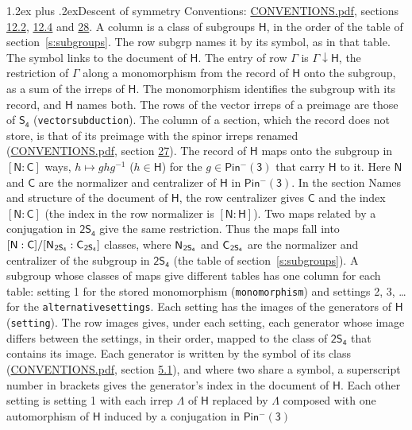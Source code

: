 \documentclass[10pt,a4paper]{article}
\makeatletter
\renewcommand\section{\@startsection{section}{1}{\z@}{-3ex plus -1ex minus -.2ex}%
  {1.2ex plus .2ex}{\normalfont\large\sffamily\bfseries\color{parttitle}}}
\numberwithin{equation}{section}
\newcommand{\grp}[1]{\mathsf{#1}}
\newcommand{\grpindex}[2]{[#1 : #2]}
\newcommand{\restr}[2]{#1\!\downarrow#2}
\newcommand{\hairsp}{\mkern1mu}
\makeatother
\begin{document}
\section{Descent of symmetry}\label{s:subduction}
Conventions: \href{../../CONVENTIONS.pdf}{CONVENTIONS.pdf}, sections \href{../../../rotation/CONVENTIONS.pdf\#conv.12.2}{12.2}, \href{../../../rotation/CONVENTIONS.pdf\#conv.12.4}{12.4} and \href{../../CONVENTIONS.pdf\#conv.28}{28}.
A column is a class of subgroups $\grp{H}$, in the order of the table of section~\ref{s:subgroups}. The row subgrp names it by its symbol, as in that table. The symbol links to the document of $\grp{H}$. The entry of row $\Gamma$ is $\restr{\Gamma}{\grp{H}}$, the restriction of $\Gamma$ along a monomorphism from the record of $\grp{H}$ onto the subgroup, as a sum of the irreps of $\grp{H}$. The monomorphism identifies the subgroup with its record, and $\grp{H}$ names both. The rows of the vector irreps of a preimage are those of \href{../../../rotation/data/pdf/S4.pdf}{$\grp{S_{4}}$} (\texttt{vectorsubduction}). The column of a section, which the record does not store, is that of its preimage with the spinor irreps renamed (\href{../../CONVENTIONS.pdf}{CONVENTIONS.pdf}, section \href{../../CONVENTIONS.pdf\#conv.27}{27}). \label{n:group.normalizer.o3}\label{n:group.centralizer.o3}\label{n:element.h}The record of $\grp{H}$ maps onto the subgroup in $\grpindex{\grp{N}}{\grp{C}}$ ways, $h \mapsto g h g^{-1}$ ($h \in \grp{H}$) for the $g \in \grp{Pin^{-}(3)}$ that carry $\grp{H}$ to it. Here $\grp{N}$ and $\grp{C}$ are the normalizer and centralizer of $\grp{H}$ in \href{Pinminus3.pdf}{$\grp{Pin^{-}(3)}$}. In the section Names and structure of the document of $\grp{H}$, the row centralizer gives $\grp{C}$ and the index $\grpindex{\grp{N}}{\grp{C}}$ (the index in the row normalizer is $\grpindex{\grp{N}}{\grp{H}}$). Two maps related by a conjugation in $\grp{2S_{4}}$ give the same restriction. Thus the maps fall into $\grpindex{\grp{N}}{\grp{C}}/\grpindex{\grp{N}_{\hairsp \grp{2S_{4}}}}{\grp{C}_{\hairsp \grp{2S_{4}}}}$ classes, where $\grp{N}_{\hairsp \grp{2S_{4}}}$ and $\grp{C}_{\hairsp \grp{2S_{4}}}$ are the normalizer and centralizer of the subgroup in $\grp{2S_{4}}$ (the table of section~\ref{s:subgroups}). \label{n:head.setting}A subgroup whose classes of maps give different tables has one column for each table: setting 1 for the stored monomorphism (\texttt{monomorphism}) and settings 2, 3, \dots{} for the \texttt{alternativesettings}. Each setting has the images of the generators of $\grp{H}$ (\texttt{setting}). \label{n:head.images}The row images gives, under each setting, each generator whose image differs between the settings, in their order, mapped to the class of $\grp{2S_{4}}$ that contains its image. Each generator is written by the symbol of its class (\href{../../CONVENTIONS.pdf}{CONVENTIONS.pdf}, section \href{../../../rotation/CONVENTIONS.pdf\#conv.5.1}{5.1}), and where two share a symbol, a superscript number in brackets gives the generator's index in the document of $\grp{H}$. \label{n:irrep.Delta}Each other setting is setting 1 with each irrep $\Lambda$ of $\grp{H}$ replaced by $\Lambda$ composed with one automorphism of $\grp{H}$ induced by a conjugation in \href{Pinminus3.pdf}{$\grp{Pin^{-}(3)}$} 
\end{document}
